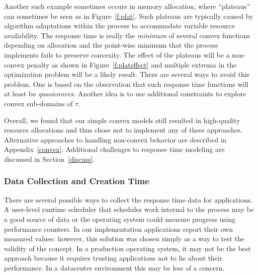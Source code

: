 Another such example sometimes occurs in memory allocation, where ``plateaus'' can sometimes be seen as in Figure~\ref{f:plat}. Such plateaus are typically caused by algorithm adaptations within the process to accommodate variable resource availability.  The response time is really the \emph{minimum} of several convex functions depending on allocation and the point-wise minimum that the process implements fails to preserve convexity.  The effect of the plateaus will be a non-convex penalty as shown in Figure~\ref{f:plateffect} and multiple extrema in the optimization problem will be a likely result. There are several ways to avoid this problem.  One is based on the observation that such response time functions will at least be \emph{quasiconvex}.  Another idea is to use additional constraints to explore convex sub-domains of $\tau$.  

Overall, we found that our simple convex models still resulted in high-quality resource allocations and thus chose not to implement any of these approaches.  Alternative approaches to handling non-convex behavior are described in Appendix~\ref{convex}. Additional challenges to response time modeling are discussed in Section~\ref{discuss}.

%
%
%


\subsubsection*{Data Collection and Creation Time}
There are several possible ways to collect the response time data for applications. A user-level runtime scheduler that schedules work internal to the process may be a good source of data or the operating system could measure progress using performance counters.  In our implementation applications report their own measured values: however, this solution was chosen simply as a way to test the validity of the concept.  In a production operating system, it may not be the best approach because it requires trusting applications not to lie about their performance.  In a datacenter environment this may be less of a concern. 

